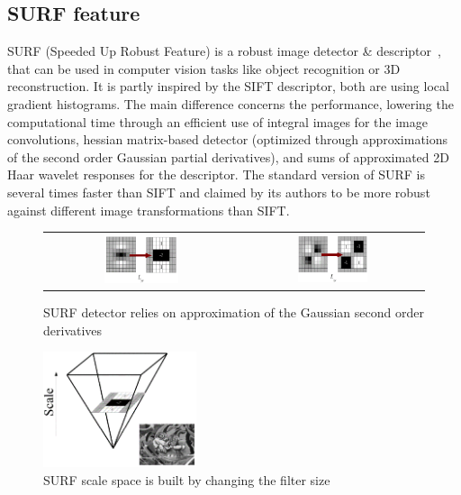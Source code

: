\subsection{SURF feature}

SURF (Speeded Up Robust Feature) is a robust image detector \& descriptor~\cite{surf}, that can be used in computer vision tasks like object recognition or 3D reconstruction. It is partly inspired by the SIFT descriptor, both are using local gradient histograms. The main difference concerns the performance, lowering the computational time through an efficient use of integral images for the image convolutions, hessian matrix-based detector (optimized through approximations of the second order Gaussian partial derivatives), and sums of approximated 2D Haar wavelet responses for the descriptor. The standard version of SURF is several times faster than SIFT and claimed by its authors to be more robust against different image transformations than SIFT. 

\begin{figure}[H]
\centering
\begin{tabular}{cc}
\includegraphics[width=0.4\textwidth]{figures/surf_lyy} &
\includegraphics[width=0.4\textwidth]{figures/surf_lxy}
\end{tabular}
\caption{SURF detector relies on approximation of the Gaussian second order derivatives}
\end{figure}

\begin{figure}[H]
\centering
\includegraphics[width=0.4\textwidth]{figures/surf_scale}
\caption{SURF scale space is built by changing the filter size}
\end{figure}

